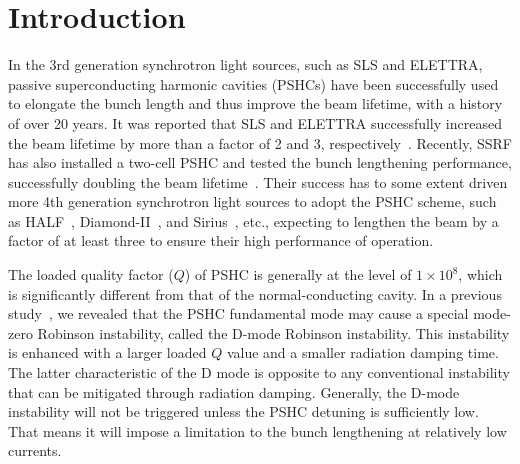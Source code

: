 \documentclass[%
 reprint,
 amsmath,amssymb,
 aps,
]{revtex4-1}
\begin{document}
\maketitle


\section{Introduction}
In the 3rd generation synchrotron light sources, such as SLS and ELETTRA, passive superconducting harmonic cavities (PSHCs) have been successfully used to elongate the bunch length and thus improve the beam lifetime, with a history of over 20 years. It was reported that SLS and ELETTRA successfully increased the beam lifetime by more than a factor of 2 and 3, respectively~\cite{Pedrozzi01}. Recently, SSRF has also installed a two-cell PSHC and tested the bunch lengthening performance, successfully doubling the beam lifetime~\cite{Zhang02}. Their success has to some extent driven more 4th generation synchrotron light sources to adopt the PSHC scheme, such as HALF~\cite{Wei03}, Diamond-II~\cite{Diamond04}, and Sirius~\cite{Sirius05}, etc., expecting to lengthen the beam by a factor of at least three to ensure their high performance of operation.

The loaded quality factor ($Q$) of PSHC is generally at the level of $1\times10^8$, which is significantly different from that of the normal-conducting cavity. In a previous study~\cite{He06}, we revealed that the PSHC fundamental mode may cause a special mode-zero Robinson instability, called the D-mode Robinson instability. This instability is enhanced with a larger loaded $Q$ value and a smaller radiation damping time. The latter characteristic of the D mode is opposite to any conventional instability that can be mitigated through radiation damping. Generally, the D-mode instability will not be triggered unless the PSHC detuning is sufficiently low. That means it will impose a limitation to the bunch lengthening at relatively low currents.
\end{document}
